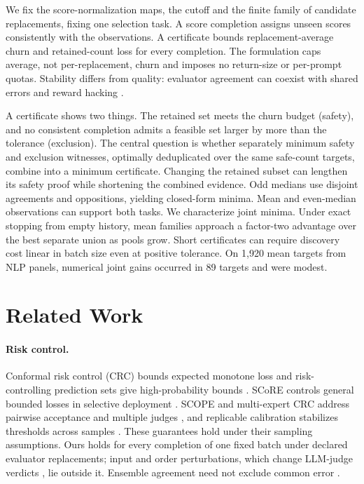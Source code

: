 \documentclass[11pt]{article}
\begin{document}
We fix the score-normalization maps, the cutoff and the finite family of candidate replacements, fixing one selection task. A score completion assigns unseen scores consistently with the observations. A certificate bounds replacement-average churn and retained-count loss for every completion. The formulation caps average, not per-replacement, churn and imposes no return-size or per-prompt quotas. Stability differs from quality: evaluator agreement can coexist with shared errors and reward hacking \citep{eisenstein2024herding}.

A certificate shows two things. The retained set meets the churn budget (safety), and no consistent completion admits a feasible set larger by more than the tolerance (exclusion). The central question is whether separately minimum safety and exclusion witnesses, optimally deduplicated over the same safe-count targets, combine into a minimum certificate. Changing the retained subset can lengthen its safety proof while shortening the combined evidence. Odd medians use disjoint agreements and oppositions, yielding closed-form minima. Mean and even-median observations can support both tasks. We characterize joint minima. Under exact stopping from empty history, mean families approach a factor-two advantage over the best separate union as pools grow. Short certificates can require discovery cost linear in batch size even at positive tolerance. On 1,920 mean targets from NLP panels, numerical joint gains occurred in 89 targets and were modest.

\section{Related Work}
\label{sec:related}
\paragraph{Risk control.}
Conformal risk control (CRC) bounds expected monotone loss and risk-controlling prediction sets give high-probability bounds \citep{angelopoulos2024crc,yeh2025conformal,bates2021rcps}. SCoRE controls general bounded losses in selective deployment \citep{bai2026score}. SCOPE and multi-expert CRC address pairwise acceptance and multiple judges \citep{badshah2026scope,cheng2026multiexpert}, and replicable calibration stabilizes thresholds across samples \citep{papamichalis2026replicableconformalprediction}. These guarantees hold under their sampling assumptions. Ours holds for every completion of one fixed batch under declared evaluator replacements; input and order perturbations, which change LLM-judge verdicts \citep{wang2024fair,li2026llmsreliablyjudgeyet}, lie outside it. Ensemble agreement need not exclude common error \citep{afrin2026evaluatorensemblesrewardhacking}.
\end{document}
